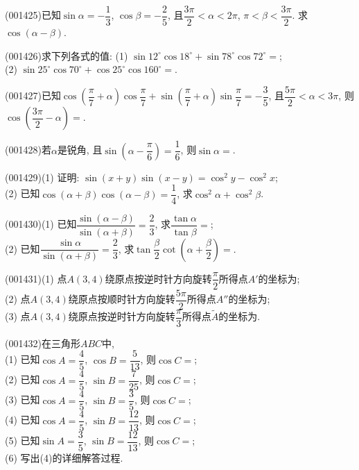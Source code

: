 \item (001425)已知$\sin\alpha=-\dfrac{1}{3}$, $\cos\beta=-\dfrac{2}{5}$, 且$\dfrac{3\pi}{2}<\alpha<2\pi$, $\pi<\beta<\dfrac{3\pi}{2}$. 求$\cos(\alpha-\beta)$.
\item (001426)求下列各式的值:
(1) $\sin 12^\circ\cos 18^\circ+\sin 78^\circ\cos 72^\circ=$;\\ 
(2) $\sin 25^\circ\cos 70^\circ+\cos 25^\circ\cos 160^\circ=$.
\item (001427)已知$\cos\left(\dfrac{\pi}{7}+\alpha\right)\cos\dfrac{\pi}{7}+\sin\left(\dfrac{\pi}{7}+\alpha\right)\sin\dfrac{\pi}{7}=-\dfrac{3}{5}$, 且$\dfrac{5\pi}{2}<\alpha<3\pi$, 则$\cos\left(\dfrac{3\pi}{2}-\alpha\right)=$.
\item (001428)若$\alpha$是锐角, 且$\sin\left(\alpha-\dfrac{\pi}6\right)=\dfrac{1}{6}$, 则$\sin\alpha=$.
\item (001429)(1) 证明: $\sin(x+y)\sin(x-y)=\cos^2y-\cos^2x$;\\ 
(2) 已知$\cos(\alpha+\beta)\cos(\alpha-\beta)=\dfrac{1}{4}$, 求$\cos^2\alpha+\cos^2\beta$.
\item (001430)(1) 已知$\dfrac{\sin(\alpha-\beta)}{\sin(\alpha+\beta)}=\dfrac{2}{3}$, 求$\dfrac{\tan\alpha}{\tan\beta}=$;\\ 
(2) 已知$\dfrac{\sin\alpha}{\sin(\alpha+\beta)}=\dfrac{2}{3}$, 求$\tan\dfrac{\beta}{2}\cot\left(\alpha+\dfrac{\beta}{2}\right)=$.
\item (001431)(1) 点$A(3,4)$绕原点按逆时针方向旋转$\dfrac{\pi}{2}$所得点$A'$的坐标为;\\ 
(2) 点$A(3,4)$绕原点按顺时针方向旋转$\dfrac{5\pi}2$所得点$A''$的坐标为;\\ 
(3) 点$A(3,4)$绕原点按逆时针方向旋转$\dfrac{\pi}3$所得点$\tilde{A}$的坐标为.
\item (001432)在三角形$ABC$中,\\ 
(1) 已知$\cos A=\dfrac{4}{5}$, $\cos B=\dfrac{5}{13}$, 则$\cos C=$;\\ 
(2) 已知$\cos A=\dfrac{4}{5}$, $\sin B=\dfrac{7}{25}$, 则$\cos C=$;\\ 
(3) 已知$\cos A=\dfrac{4}{5}$, $\sin B=\dfrac{3}{5}$, 则$\cos C=$;\\ 
(4) 已知$\cos A=\dfrac{4}{5}$, $\sin B=\dfrac{12}{13}$, 则$\cos C=$;\\ 
(5) 已知$\sin A=\dfrac{3}{5}$, $\sin B=\dfrac{12}{13}$, 则$\cos C=$;\\ 
(6) 写出(4)的详细解答过程.
